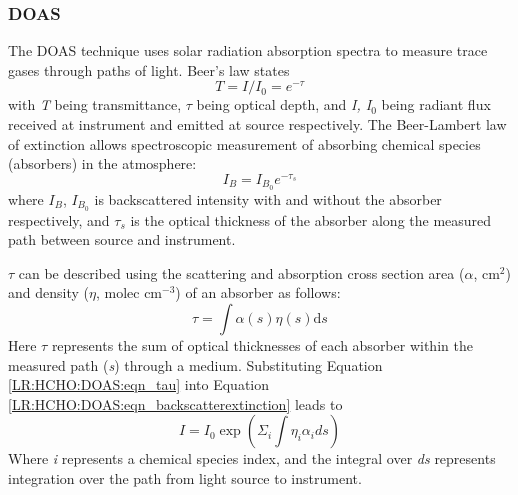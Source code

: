     \subsubsection{DOAS}
      \label{LR:HCHO:DOAS}
      
      The DOAS technique uses solar radiation absorption spectra to measure trace gases through paths of light.
      Beer's law states
      \begin{equation} \label{LR:HCHO:DOAS:eqn_beerslaw}
      T = I/I_0 = e^{-\tau}
      \end{equation}
      with \textit{T} being transmittance, $\tau$ being optical depth, and \textit{I, I$_0$} being radiant flux received at instrument and emitted at source respectively.
      The Beer-Lambert law of extinction allows spectroscopic measurement of absorbing chemical species (absorbers) in the atmosphere:
      \begin{equation} \label{LR:HCHO:DOAS:eqn_backscatterextinction}
      I_B = I_{B_0} e^{-\tau_s}
      \end{equation}
      where $I_B$, $I_{B_0}$ is backscattered intensity with and without the absorber respectively, and $\tau_s$ is the optical thickness of the absorber along the measured path between source and instrument.
      
      $\tau$ can be described using the scattering and absorption cross section area ($\alpha$, cm$^{2}$) and density ($\eta$, molec cm$^{-3}$) of an absorber as follows:
      \begin{equation} \label{LR:HCHO:DOAS:eqn_tau}
      \tau = \int \alpha(s) \eta(s) \mathrm{d}s
      \end{equation}
      Here $\tau$ represents the sum of optical thicknesses of each absorber within the measured path (\textit{s}) through a medium.
      Substituting Equation \ref{LR:HCHO:DOAS:eqn_tau} into Equation \ref{LR:HCHO:DOAS:eqn_backscatterextinction} leads to
      \begin{equation}
      I = I_0 \exp { \left( \Sigma_i \int \eta_i \alpha_i ds \right) }
      \end{equation}
      Where \textit{i} represents a chemical species index, and the integral over \textit{ds} represents integration over the path from light source to instrument.
      
